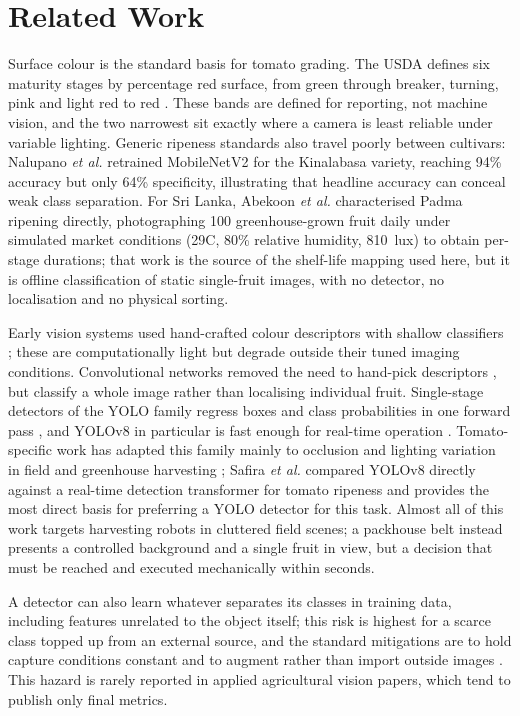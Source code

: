 \documentclass[journal]{IEEEtran}
\begin{document}
\section{Related Work}
\label{sec:related}
Surface colour is the standard basis for tomato grading. The USDA defines six maturity stages by percentage red surface, from green through breaker, turning, pink and light red to red \cite{usda1991}. These bands are defined for reporting, not machine vision, and the two narrowest sit exactly where a camera is least reliable under variable lighting. Generic ripeness standards also travel poorly between cultivars: Nalupano \textit{et al.} \cite{nalupano2024} retrained MobileNetV2 for the Kinalabasa variety, reaching 94\% accuracy but only 64\% specificity, illustrating that headline accuracy can conceal weak class separation. For Sri Lanka, Abekoon \textit{et al.} \cite{abekoon2024} characterised Padma ripening directly, photographing 100 greenhouse-grown fruit daily under simulated market conditions (29\textdegree C, 80\% relative humidity, 810~lux) to obtain per-stage durations; that work is the source of the shelf-life mapping used here, but it is offline classification of static single-fruit images, with no detector, no localisation and no physical sorting.

Early vision systems used hand-crafted colour descriptors with shallow classifiers \cite{santoso2024,liu2019,garcia2019,ifmalinda2023}; these are computationally light but degrade outside their tuned imaging conditions. Convolutional networks removed the need to hand-pick descriptors \cite{allo2025,centino2025,waseem2025}, but classify a whole image rather than localising individual fruit. Single-stage detectors of the YOLO family regress boxes and class probabilities in one forward pass \cite{redmon2016}, and YOLOv8 in particular is fast enough for real-time operation \cite{terven2023}. Tomato-specific work has adapted this family mainly to occlusion and lighting variation in field and greenhouse harvesting \cite{yang2025,fan2026,huang2025,ding2026,wang2026}; Safira \textit{et al.} \cite{safira2026} compared YOLOv8 directly against a real-time detection transformer for tomato ripeness and provides the most direct basis for preferring a YOLO detector for this task. Almost all of this work targets harvesting robots in cluttered field scenes; a packhouse belt instead presents a controlled background and a single fruit in view, but a decision that must be reached and executed mechanically within seconds.

A detector can also learn whatever separates its classes in training data, including features unrelated to the object itself; this risk is highest for a scarce class topped up from an external source, and the standard mitigations are to hold capture conditions constant and to augment rather than import outside images \cite{shorten2019,buslaev2020}. This hazard is rarely reported in applied agricultural vision papers, which tend to publish only final metrics.
\end{document}
